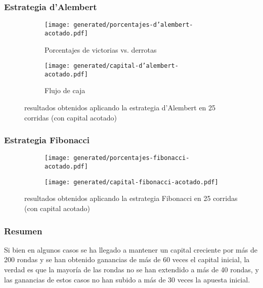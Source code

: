 \documentclass{article}
\begin{document}
  \subsubsection{Estrategia d’Alembert}
  \begin{figure}[H]
    \centering
    \begin{subfigure}{0.5\textwidth}
      \centering
      \texttt{[image: generated/porcentajes-d'alembert-acotado.pdf]}
      \caption{Porcentajes de victorias vs. derrotas}
    \end{subfigure}%
    \begin{subfigure}{0.5\textwidth}
      \centering
      \texttt{[image: generated/capital-d'alembert-acotado.pdf]}
      \caption{Flujo de caja}
    \end{subfigure}
    \caption{resultados obtenidos aplicando la estrategia d’Alembert en 25 corridas (con capital acotado)}
  \end{figure}

  \subsubsection{Estrategia Fibonacci}
  \begin{figure}[H]
    \centering
    \begin{subfigure}{0.5\textwidth}
      \centering
      \texttt{[image: generated/porcentajes-fibonacci-acotado.pdf]}
    \end{subfigure}%
    \begin{subfigure}{0.5\textwidth}
      \centering
      \texttt{[image: generated/capital-fibonacci-acotado.pdf]}
    \end{subfigure}
    \caption{resultados obtenidos aplicando la estrategia Fibonacci en 25 corridas (con capital acotado)}
  \end{figure}

  \subsubsection{Resumen}

  Si bien en algunos casos se ha llegado a mantener un capital creciente por más de 200 rondas y se han obtenido
  ganancias de más de 60 veces el capital inicial, la verdad es que la mayoría de las rondas no se han extendido a más
  de 40 rondas, y las ganancias de estos casos no han subido a más de 30 veces la apuesta inicial.
\end{document}
